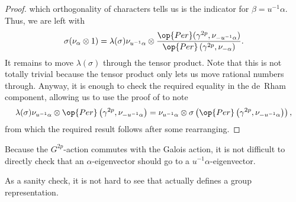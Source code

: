 \documentclass[../thesis.tex]{subfiles}
\begin{document}
\begin{proof}
	which orthogonality of characters tells us is the indicator for $\beta=u^{-1}\alpha$. Thus, we are left with
	\[\sigma(\nu_\alpha\otimes1)=\lambda(\sigma)\nu_{u^{-1}\alpha}\otimes\frac{\op{Per}(\gamma^{2p},\nu_{-u^{-1}\alpha})}{\op{Per}\left(\gamma^{2p},\nu_{-\alpha}\right)}.\]
	It remains to move $\lambda(\sigma)$ through the tensor product. Note that this is not totally trivial because the tensor product only lets us move rational numbers through. Anyway, it is enough to check the required equality in the de~Rham component, allowing us to use the proof of  to note
	\[\lambda(\sigma)\nu_{u^{-1}\alpha}\otimes \op{Per}\left(\gamma^{2p},\nu_{-u^{-1}\alpha}\right)=\nu_{u^{-1}\alpha}\otimes \sigma\left(\op{Per}\left(\gamma^{2p},\nu_{-u^{-1}\alpha}\right)\right),\]
	from which the required result follows after some rearranging.
\end{proof}
\begin{remark}
	Because the $G^{2p}$-action commutes with the Galois action, it is not difficult to directly check that an $\alpha$-eigenvector should go to a $u^{-1}\alpha$-eigenvector.
\end{remark}
\begin{remark}
	As a sanity check, it is not hard to see that  actually defines a group representation.
\end{remark}
\end{document}
